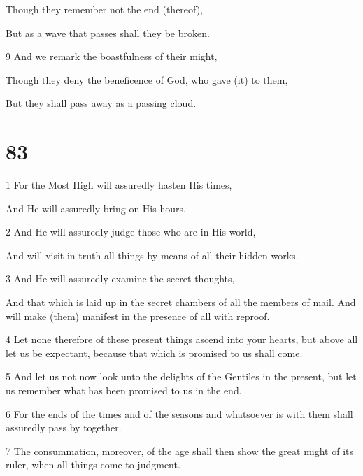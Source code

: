 \par Though they remember not the end (thereof),

\par But as a wave that passes shall they be broken.

\par 9 And we remark the boastfulness of their might,

\par Though they deny the beneficence of God, who gave (it) to them,

\par But they shall pass away as a passing cloud.

\chapter{83}

\par 1 For the Most High will assuredly hasten His times,

\par And He will assuredly bring on His hours.

\par 2 And He will assuredly judge those who are in His world,

\par And will visit in truth all things by means of all their hidden works.

\par 3 And He will assuredly examine the secret thoughts,

\par And that which is laid up in the secret chambers of all the members of mail. And will make (them) manifest in the presence of all with reproof.

\par 4 Let none therefore of these present things ascend into your hearts, but above all let us be expectant, because that which is promised to us shall come. 

\par 5 And let us not now look unto the delights of the Gentiles in the present, but let us remember what has been promised to us in the end. 

\par 6 For the ends of the times and of the seasons and whatsoever is with them shall assuredly pass by together. 

\par 7 The consummation, moreover, of the age shall then show the great might of its ruler, when all things come to judgment. 

